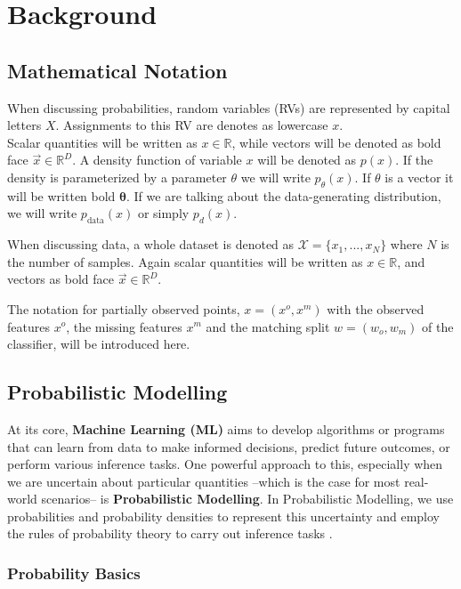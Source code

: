 \chapter{Background}
\label{cha:background}

\section{Mathematical Notation}

When discussing probabilities, random variables (RVs) are represented by capital letters $X$. Assignments to this RV are denotes as lowercase $x$. \\ 
Scalar quantities will be written as $x \in \mathbb{R}$, while vectors will be denoted as bold face $\vec x \in \mathbb{R}^D$.
A density function of variable $x$ will be denoted as $p(x)$. If the density is parameterized by a parameter $\theta$ we will write 
$p_\theta(x)$. If $\theta$ is a vector it will be written bold $\boldsymbol{\theta}$.
If we are talking about the data-generating distribution, we will write $p_{\text{data}}(x)$ or simply $p_d(x)$.

When discussing data, a whole dataset is denoted as $\mathcal{X} = \{x_1, ... , x_N\}$ where $N$ is the number of samples. 
Again scalar quantities will be written as $x \in \mathbb{R}$, and vectors as bold face $\vec x \in \mathbb{R}^D$.

The notation for partially observed points, $x = (x^o, x^m)$ with the observed features $x^o$, the missing features $x^m$ and the matching split $w = (w_o, w_m)$ of the classifier, will be introduced here.

\section{Probabilistic Modelling}
\label{sec:pm}

At its core, \textbf{Machine Learning (ML)} aims to develop algorithms or programs that can learn from data to make informed decisions, predict future outcomes, or perform various inference tasks. 
One powerful approach to this, especially when we are uncertain about particular quantities
--which is the case for most real-world scenarios-- is \textbf{Probabilistic Modelling}.
In Probabilistic Modelling, we use probabilities and probability densities to represent this uncertainty and employ the rules of probability theory to carry out inference tasks \cite{pc_intro}.

\subsection{Probability Basics}
\label{sec:prob_basics}

